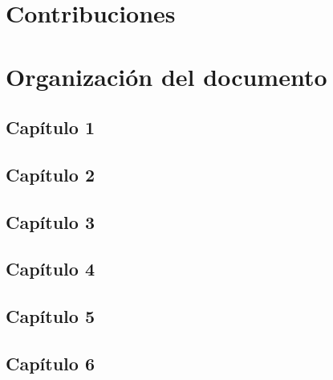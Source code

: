 	\section{Contribuciones}
	
	\section{Organizaci\'on del documento}
	\subsection{Cap\'itulo 1}
	\subsection{Cap\'itulo 2}
	\subsection{Cap\'itulo 3}
	\subsection{Cap\'itulo 4}
	\subsection{Cap\'itulo 5}
	\subsection{Cap\'itulo 6}